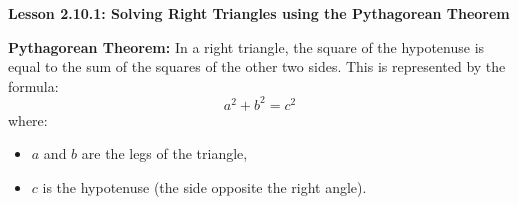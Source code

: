  \begin{center}
\textbf{Lesson 2.10.1: Solving Right Triangles using the Pythagorean Theorem}
\end{center}


\textbf{Pythagorean Theorem:} In a right triangle, the square of the hypotenuse is equal to the sum of the squares of the other two sides. This is represented by the formula:
\[
a^2 + b^2 = c^2
\]
where:
\begin{itemize}
    \item \(a\) and \(b\) are the legs of the triangle,
    \item \(c\) is the hypotenuse (the side opposite the right angle).
\end{itemize}
